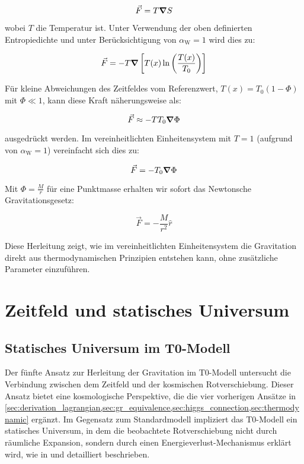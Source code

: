 \documentclass[12pt,a4paper]{article}
\newcommand{\Tfield}{T(x)}
\newcommand{\Tzero}{T_0}
\newcommand{\alphaW}{\alpha_{\text{W}}}
\begin{document}
	\begin{equation}
		\vec{F} = T \grad S
	\end{equation}
	
	wobei \(T\) die Temperatur ist. Unter Verwendung der oben definierten Entropiedichte und unter Berücksichtigung von \(\alphaW = 1\) wird dies zu:
	
	\begin{equation}
		\vec{F} = -T \grad\left[\Tfield \ln\left(\frac{\Tfield}{\Tzero}\right)\right]
	\end{equation}
	
	Für kleine Abweichungen des Zeitfeldes vom Referenzwert, \(\Tfield = \Tzero(1 - \Phi)\) mit \(\Phi \ll 1\), kann diese Kraft näherungsweise als:
	
	\begin{equation}
		\vec{F} \approx -T \Tzero \grad \Phi
	\end{equation}
	
	ausgedrückt werden. Im vereinheitlichten Einheitensystem mit \(T = 1\) (aufgrund von \(\alphaW = 1\)) vereinfacht sich dies zu:
	
	\begin{equation}
		\vec{F} = -\Tzero \grad \Phi
	\end{equation}
	
	Mit \(\Phi = \frac{M}{r}\) für eine Punktmasse erhalten wir sofort das Newtonsche Gravitationsgesetz:
	
	\begin{equation}
		\vec{F} = -\frac{M}{r^2} \hat{r}
	\end{equation}
	
	Diese Herleitung zeigt, wie im vereinheitlichten Einheitensystem die Gravitation direkt aus thermodynamischen Prinzipien entstehen kann, ohne zusätzliche Parameter einzuführen.
	
	\section{Zeitfeld und statisches Universum}
	\label{sec:static_universe}
	
	\subsection{Statisches Universum im T0-Modell}
	\label{subsec:static_universe_model}
	Der fünfte Ansatz zur Herleitung der Gravitation im T0-Modell untersucht die Verbindung zwischen dem Zeitfeld und der kosmischen Rotverschiebung. Dieser Ansatz bietet eine kosmologische Perspektive, die die vier vorherigen Ansätze in \cref{sec:derivation_lagrangian,sec:gr_equivalence,sec:higgs_connection,sec:thermodynamic} ergänzt. Im Gegensatz zum Standardmodell impliziert das T0-Modell ein statisches Universum, in dem die beobachtete Rotverschiebung nicht durch räumliche Expansion, sondern durch einen Energieverlust-Mechanismus erklärt wird, wie in \cite{pascher_messdifferenzen_2025} und \cite{pascher_galaxies_2025} detailliert beschrieben.
	
\end{document}
